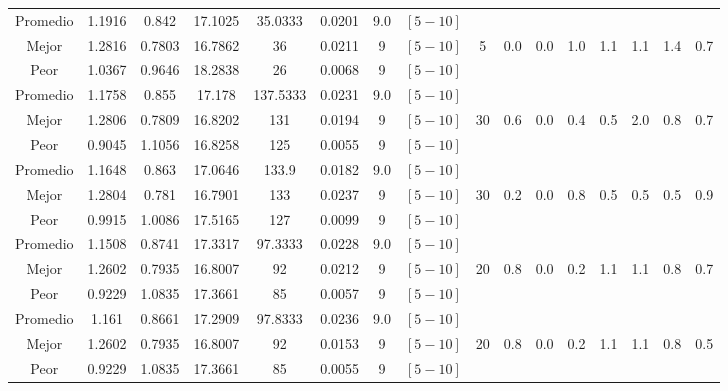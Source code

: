 \begin{table}[h!]
\begin{center}
\begin{tabular}{|c|c|c|c|c|c|c|c|c|c|c|c|c|c|c|c|}
            Promedio  & 1.1916 & 0.842 & 17.1025 & 35.0333 & 0.0201 & 9.0 & $[5-10]$ &  &  &  &  &  &  &  & \\
            \cline{1-8}
            Mejor & 1.2816 & 0.7803  & 16.7862 & 36 & 0.0211 & 9 & $[5-10]$ & 5 & 0.0 & 0.0 & 1.0 & 1.1 & 1.1 & 1.4 & 0.7\\
            \cline{1-8}
            Peor & 1.0367 & 0.9646  & 18.2838 & 26 & 0.0068 & 9 & $[5-10]$ &  &  &  &  &  &  &  & \\
        \hline
        \hline
            Promedio  & 1.1758 & 0.855 & 17.178 & 137.5333 & 0.0231 & 9.0 & $[5-10]$ &  &  &  &  &  &  &  & \\
            \cline{1-8}
            Mejor & 1.2806 & 0.7809  & 16.8202 & 131 & 0.0194 & 9 & $[5-10]$ & 30 & 0.6 & 0.0 & 0.4 & 0.5 & 2.0 & 0.8 & 0.7\\
            \cline{1-8}
            Peor & 0.9045 & 1.1056  & 16.8258 & 125 & 0.0055 & 9 & $[5-10]$ &  &  &  &  &  &  &  & \\
        \hline
        \hline
            Promedio  & 1.1648 & 0.863 & 17.0646 & 133.9 & 0.0182 & 9.0 & $[5-10]$ &  &  &  &  &  &  &  & \\
            \cline{1-8}
            Mejor & 1.2804 & 0.781  & 16.7901 & 133 & 0.0237 & 9 & $[5-10]$ & 30 & 0.2 & 0.0 & 0.8 & 0.5 & 0.5 & 0.5 & 0.9\\
            \cline{1-8}
            Peor & 0.9915 & 1.0086  & 17.5165 & 127 & 0.0099 & 9 & $[5-10]$ &  &  &  &  &  &  &  & \\
        \hline
        \hline
            Promedio  & 1.1508 & 0.8741 & 17.3317 & 97.3333 & 0.0228 & 9.0 & $[5-10]$ &  &  &  &  &  &  &  & \\
            \cline{1-8}
            Mejor & 1.2602 & 0.7935  & 16.8007 & 92 & 0.0212 & 9 & $[5-10]$ & 20 & 0.8 & 0.0 & 0.2 & 1.1 & 1.1 & 0.8 & 0.7\\
            \cline{1-8}
            Peor & 0.9229 & 1.0835  & 17.3661 & 85 & 0.0057 & 9 & $[5-10]$ &  &  &  &  &  &  &  & \\
        \hline
        \hline
            Promedio  & 1.161 & 0.8661 & 17.2909 & 97.8333 & 0.0236 & 9.0 & $[5-10]$ &  &  &  &  &  &  &  & \\
            \cline{1-8}
            Mejor & 1.2602 & 0.7935  & 16.8007 & 92 & 0.0153 & 9 & $[5-10]$ & 20 & 0.8 & 0.0 & 0.2 & 1.1 & 1.1 & 0.8 & 0.5\\
            \cline{1-8}
            Peor & 0.9229 & 1.0835  & 17.3661 & 85 & 0.0055 & 9 & $[5-10]$ &  &  &  &  &  &  &  & \\

\end{tabular}
\end{center}
\end{table}
